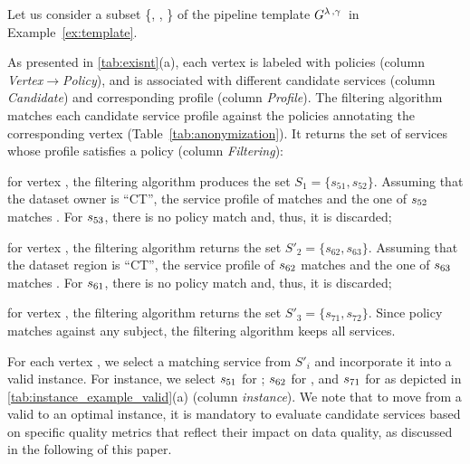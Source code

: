 \begin{example}[\bf \pipelineInstance]\label{ex:instance}

Let us consider a subset \{, , \} of the pipeline template $G^{\lambda\,,\gamma\,}$ in Example~\ref{ex:template}.

As presented in \cref{tab:exisnt}(a), each vertex is labeled with policies (column \emph{Vertex$\rightarrow$Policy}), and is associated with different candidate services (column \emph{Candidate}) and corresponding profile (column \emph{Profile}). The filtering algorithm matches each candidate service profile against the policies annotating the corresponding vertex (Table~\ref{tab:anonymization}). It returns the set of services whose profile satisfies a policy (column \emph{Filtering}):
\begin{enumerate*}[label=\textit{\roman*})]
  \item for vertex , the filtering algorithm produces the set $S_{1}=\{s_{51},s_{52}\}$. Assuming that the dataset owner is ``CT'', the service profile of  matches  and the one of $s_{52}$ matches . For $s_{53}$, there is no policy match and, thus, it is discarded;
  \item for vertex , the filtering algorithm returns the set $S'_2=\{s_{62},s_{63}\}$. Assuming that the dataset region is ``CT'', the service profile of $s_{62}$ matches  and the one of $s_{63}$ matches . For $s_{61}$, there is no policy match and, thus, it is discarded;
  \item for vertex , the filtering algorithm returns the set $S'_3=\{s_{71},s_{72}\}$. Since policy  matches against any subject, the filtering algorithm keeps all services.
\end{enumerate*}

For each vertex , we select a matching service  from $S'_i$ and incorporate it into a valid instance. For instance, we select $s_{51}$ for ; $s_{62}$ for , and $s_{71}$ for  as depicted in \cref{tab:instance_example_valid}(a) (column \emph{instance}). We note that to move from a valid to an optimal instance, it is mandatory to evaluate candidate services based on specific quality metrics that reflect their impact on data quality, as discussed in the following of this paper.

\begin{table*}
  \def\arraystretch{1.5}
  \caption{Instance example}\label{tab:exisnt}

\end{table*}
\end{example}
